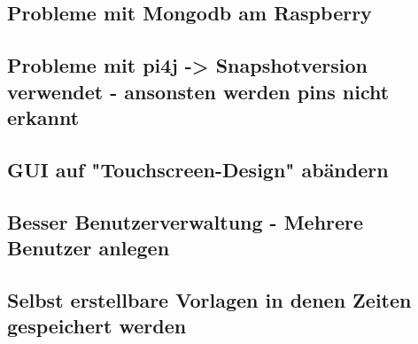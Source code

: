 \subsection{Probleme mit Mongodb am Raspberry}
\subsection{Probleme mit pi4j -> Snapshotversion verwendet - ansonsten werden pins nicht erkannt}
\subsection{GUI auf "Touchscreen-Design" abändern}
\subsection{Besser Benutzerverwaltung - Mehrere Benutzer anlegen}
\subsection{Selbst erstellbare Vorlagen in denen Zeiten gespeichert werden}
